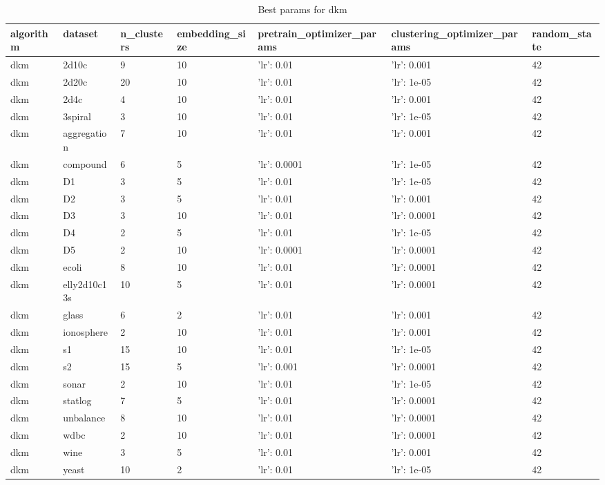 \clearpage

\begin{table}[H]
\centering
\caption{Best params for dkm}
\label{S23_Table}
\begin{tabular}{|l|l|l|l|l|l|l|}
\hline
algorithm & dataset & n\_clusters & embedding\_size & pretrain\_optimizer\_params & clustering\_optimizer\_params & random\_state \\
\hline
dkm & 2d10c & 9 & 10 & {'lr': 0.01} & {'lr': 0.001} & 42 \\
\hline
dkm & 2d20c & 20 & 10 & {'lr': 0.01} & {'lr': 1e-05} & 42 \\
\hline
dkm & 2d4c & 4 & 10 & {'lr': 0.01} & {'lr': 0.001} & 42 \\
\hline
dkm & 3spiral & 3 & 10 & {'lr': 0.01} & {'lr': 1e-05} & 42 \\
\hline
dkm & aggregation & 7 & 10 & {'lr': 0.01} & {'lr': 0.001} & 42 \\
\hline
dkm & compound & 6 & 5 & {'lr': 0.0001} & {'lr': 1e-05} & 42 \\
\hline
dkm & D1 & 3 & 5 & {'lr': 0.01} & {'lr': 1e-05} & 42 \\
\hline
dkm & D2 & 3 & 5 & {'lr': 0.01} & {'lr': 0.001} & 42 \\
\hline
dkm & D3 & 3 & 10 & {'lr': 0.01} & {'lr': 0.0001} & 42 \\
\hline
dkm & D4 & 2 & 5 & {'lr': 0.01} & {'lr': 1e-05} & 42 \\
\hline
dkm & D5 & 2 & 10 & {'lr': 0.0001} & {'lr': 0.0001} & 42 \\
\hline
dkm & ecoli & 8 & 10 & {'lr': 0.01} & {'lr': 0.0001} & 42 \\
\hline
dkm & elly2d10c13s & 10 & 5 & {'lr': 0.01} & {'lr': 0.0001} & 42 \\
\hline
dkm & glass & 6 & 2 & {'lr': 0.01} & {'lr': 0.001} & 42 \\
\hline
dkm & ionosphere & 2 & 10 & {'lr': 0.01} & {'lr': 0.001} & 42 \\
\hline
dkm & s1 & 15 & 10 & {'lr': 0.01} & {'lr': 1e-05} & 42 \\
\hline
dkm & s2 & 15 & 5 & {'lr': 0.001} & {'lr': 0.0001} & 42 \\
\hline
dkm & sonar & 2 & 10 & {'lr': 0.01} & {'lr': 1e-05} & 42 \\
\hline
dkm & statlog & 7 & 5 & {'lr': 0.01} & {'lr': 0.0001} & 42 \\
\hline
dkm & unbalance & 8 & 10 & {'lr': 0.01} & {'lr': 0.0001} & 42 \\
\hline
dkm & wdbc & 2 & 10 & {'lr': 0.01} & {'lr': 0.0001} & 42 \\
\hline
dkm & wine & 3 & 5 & {'lr': 0.01} & {'lr': 0.001} & 42 \\
\hline
dkm & yeast & 10 & 2 & {'lr': 0.01} & {'lr': 1e-05} & 42 \\
\hline
\end{tabular}
\end{table}

